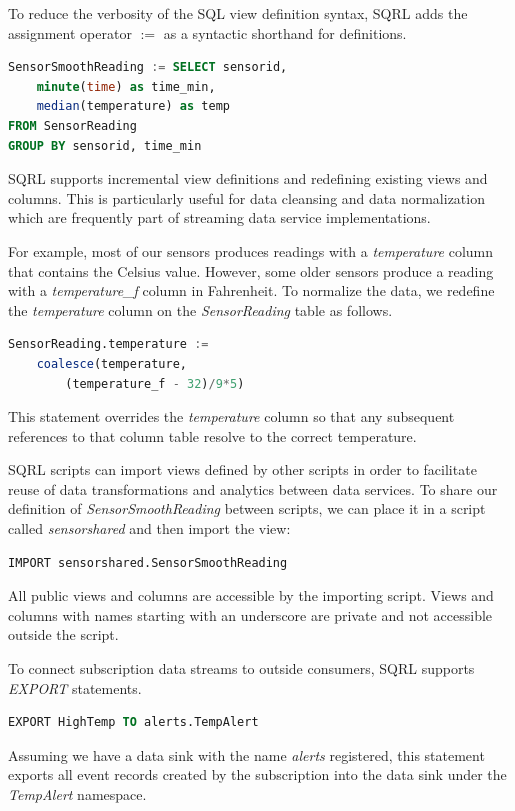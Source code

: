 \documentclass[	DIV=calc,%
							paper=letter,%
							fontsize=11pt,%
							twocolumn]{scrartcl}	 					%
\begin{document}
To reduce the verbosity of the SQL view definition syntax, SQRL adds the assignment operator $:=$ as a syntactic shorthand for definitions.

\begin{lstlisting}[language=SQL]
SensorSmoothReading := SELECT sensorid,
    minute(time) as time_min,
    median(temperature) as temp
FROM SensorReading
GROUP BY sensorid, time_min
\end{lstlisting}

SQRL supports incremental view definitions and redefining existing views and columns. This is particularly useful for data cleansing and data normalization which are frequently part of streaming data service implementations.

For example, most of our sensors produces readings with a \emph{temperature} column that contains the Celsius value. However, some older sensors produce a reading with a \emph{temperature\_f} column in Fahrenheit. To normalize the data, we redefine the \emph{temperature} column on the \emph{SensorReading} table as follows.

\begin{lstlisting}[language=SQL]
SensorReading.temperature :=
    coalesce(temperature,
        (temperature_f - 32)/9*5)
\end{lstlisting}

This statement overrides the \emph{temperature} column so that any subsequent references to that column table resolve to the correct temperature.

SQRL scripts can import views defined by other scripts in order to facilitate reuse of data transformations and analytics between data services. To share our definition of \emph{SensorSmoothReading} between scripts, we can place it in a script called \emph{sensorshared} and then import the view:
\begin{lstlisting}[language=SQL]
IMPORT sensorshared.SensorSmoothReading
\end{lstlisting}

All public views and columns are accessible by the importing script. Views and columns with names starting with an underscore are private and not accessible outside the script.

To connect subscription data streams to outside consumers, SQRL supports \emph{EXPORT} statements.
\begin{lstlisting}[language=SQL]
EXPORT HighTemp TO alerts.TempAlert
\end{lstlisting}
Assuming we have a data sink with the name \emph{alerts} registered, this statement exports all event records created by the subscription into the data sink under the \emph{TempAlert} namespace.
\end{document}
